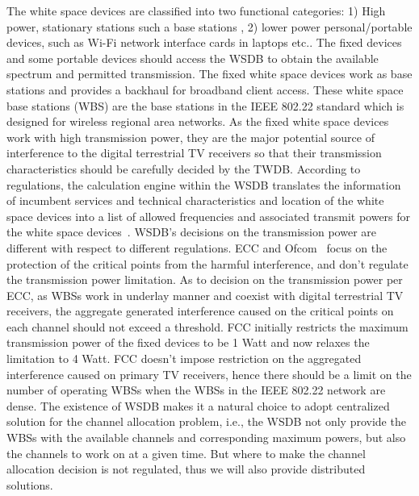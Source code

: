 \documentclass[times]{ettauth}
\newcommand{\ie}{i.e., }
\theoremstyle{mytheoremstyle}
\theoremstyle{mytheoremstyle}
\theoremstyle{mytheoremstyle}
\begin{document}
The white space devices are classified into two functional categories: 1) High power, stationary stations such a base stations , 2) lower power personal/portable devices, such as Wi-Fi network interface cards in laptops etc..
The fixed devices and some portable devices should access the WSDB to obtain the available spectrum and permitted transmission.
%
The fixed white space devices work as base stations and provides a backhaul for broadband client access.
These white space base stations (WBS) are the base stations in the IEEE 802.22 standard which is designed for wireless regional area networks.
As the fixed white space devices work with high transmission power, they are the major potential source of interference to the digital terrestrial TV receivers so that their transmission characteristics should be carefully decided by the TWDB.
According to regulations, the calculation engine within the WSDB translates the information of incumbent services and technical characteristics and location of the white space devices into a list of allowed frequencies and associated transmit powers for the white space devices~\cite{ECC236}.
WSDB's decisions on the transmission power are different with respect to different regulations.
ECC and Ofcom~\cite{ECC186, ECMA392} focus on the protection of the critical points from the harmful interference, and don't regulate the transmission power limitation. 
As to decision on the transmission power per ECC, as WBSs work in underlay manner and coexist with digital terrestrial TV receivers, the aggregate generated interference caused on the critical points on each channel should not exceed a threshold.
FCC initially restricts the maximum transmission power of the fixed devices to be 1 Watt and now relaxes the limitation to 4 Watt.
FCC doesn't impose restriction on the aggregated interference caused on primary TV receivers, hence there should be a limit on the number of operating WBSs when the WBSs in the IEEE 802.22 network are dense.
%
The existence of WSDB makes it a natural choice to adopt centralized solution for the channel allocation problem, \ie the WSDB not only provide the WBSs with the available channels and corresponding maximum powers, but also the channels to work on at a given time.
But where to make the channel allocation decision is not regulated, thus we will also provide distributed solutions.
\end{document}
